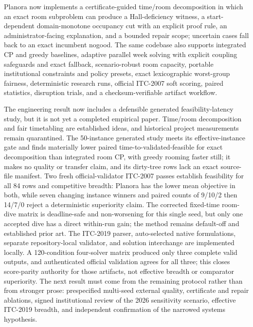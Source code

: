 Planora now implements a certificate-guided time/room decomposition in which an exact room subproblem can produce a Hall-deficiency witness, a start-dependent domain-monotone occupancy cut with an explicit proof rule, an administrator-facing explanation, and a bounded repair scope; uncertain cases fall back to an exact incumbent nogood.
The same codebase also supports integrated CP and greedy baselines, adaptive parallel week solving with explicit coupling safeguards and exact fallback, scenario-robust room capacity, portable institutional constraints and policy presets, exact lexicographic worst-group fairness, deterministic research runs, official ITC-2007 soft scoring, paired statistics, disruption trials, and a checksum-verifiable artifact workflow.

The engineering result now includes a defensible generated feasibility-latency study, but it is not yet a completed empirical paper.
Time/room decomposition and fair timetabling are established ideas, and historical project measurements remain quarantined.
The 50-instance generated study meets its effective-instance gate and finds materially lower paired time-to-validated-feasible for exact decomposition than integrated room CP, with greedy rooming faster still; it makes no quality or transfer claim, and its dirty-tree rows lack an exact source-file manifest.
Two fresh official-validator ITC-2007 passes establish feasibility for all 84 rows and competitive breadth: Planora has the lower mean objective in both, while seven changing instance winners and paired counts of 9/10/2 then 14/7/0 reject a deterministic superiority claim.
The corrected fixed-time room-dive matrix is deadline-safe and non-worsening for this single seed, but only one accepted dive has a direct within-run gain; the method remains default-off and established prior art.
The ITC-2019 parser, auto-selected native formulations, separate repository-local validator, and solution interchange are implemented locally. A 120-condition four-solver matrix produced only three complete valid outputs, and authenticated official validation agrees for all three; this closes score-parity authority for those artifacts, not effective breadth or comparator superiority.
The next result must come from the remaining protocol rather than from stronger prose: prespecified multi-seed external quality, certificate and repair ablations, signed institutional review of the 2026 sensitivity scenario, effective ITC-2019 breadth, and independent confirmation of the narrowed systems hypothesis.
